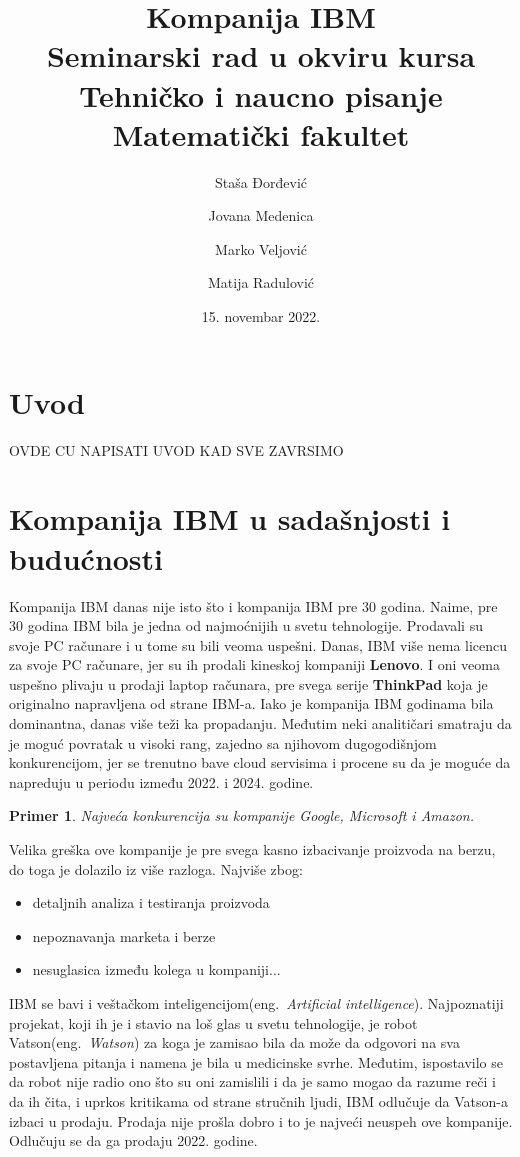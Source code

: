 \documentclass[a4paper]{article}
\title{Kompanija IBM \\
\normalsize Seminarski rad u okviru kursa\\ Tehničko i naucno pisanje
\\Matematički fakultet}
\author{Staša Đorđević \and
Jovana Medenica \and
Marko Veljović \and
Matija Radulović} %
\date{15. novembar 2022.} %
\newtheorem{primer}{Primer}[section]
\begin{document}
\maketitle
\tableofcontents
\section{Uvod}
OVDE CU NAPISATI UVOD KAD SVE ZAVRSIMO %
\section{Kompanija IBM u sadašnjosti i budućnosti}
Kompanija IBM danas nije isto što i kompanija IBM pre 30 godina. Naime, pre 30 godina IBM bila je jedna od najmoćnijih u svetu tehnologije. Prodavali su svoje PC računare i u tome su bili veoma uspešni.
Danas, IBM više nema licencu za svoje PC računare, jer su ih prodali kineskoj kompaniji \textbf{Lenovo}\cite{lit1}. I oni veoma uspešno plivaju u prodaji laptop računara, pre svega serije \textbf{ThinkPad} koja je originalno napravljena od strane IBM-a. Iako je kompanija IBM godinama bila dominantna, danas više teži ka propadanju. Međutim neki analitičari smatraju da je moguć povratak u visoki rang, zajedno sa njihovom dugogodišnjom konkurencijom, jer se trenutno bave cloud servisima i procene su da je moguće da napreduju u periodu između 2022. i 2024. godine.

\begin{primer}
Najveća konkurencija su kompanije Google, Microsoft i Amazon.
\end{primer}

Velika greška ove kompanije je pre svega kasno izbacivanje proizvoda na berzu, do toga je dolazilo iz više razloga. Najviše zbog:

\begin{itemize}
\item detaljnih analiza i testiranja proizvoda
\item nepoznavanja marketa i berze
\item nesuglasica između kolega u kompaniji...
\end{itemize}

IBM se bavi i veštačkom inteligencijom(eng.~{\em Artificial intelligence}). Najpoznatiji projekat, koji ih je i stavio na loš glas u svetu tehnologije, je robot Vatson(eng.~{\em Watson}) za koga je zamisao bila da može da odgovori na sva postavljena pitanja i namena je bila u medicinske svrhe. Međutim, ispostavilo se da robot nije radio ono što su oni zamislili i da je samo mogao da razume reči i da ih čita, i uprkos kritikama od strane stručnih ljudi, IBM odlučuje da Vatson-a izbaci u prodaju. Prodaja nije prošla dobro i to je najveći neuspeh ove kompanije. Odlučuju se da ga prodaju 2022. godine.
\end{document}
